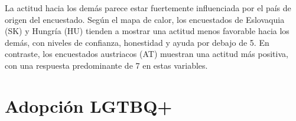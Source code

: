\documentclass{article}
\begin{document}
La actitud hacia los demás parece estar fuertemente influenciada por el país de origen del encuestado. Según el mapa de calor, los encuestados de Eslovaquia (SK) y Hungría (HU) tienden a mostrar una actitud menos favorable hacia los demás, con niveles de confianza, honestidad y ayuda por debajo de 5. En contraste, los encuestados austriacos (AT) muestran una actitud más positiva, con una respuesta predominante de 7 en estas variables.




\section{Adopción LGTBQ+}

\end{document}
